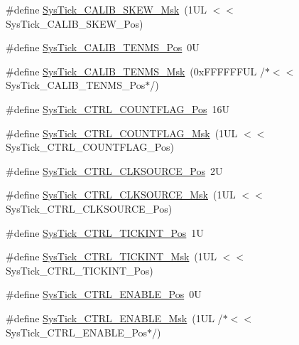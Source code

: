 \begin{DoxyCompactItemize}
\item 
\#define \hyperlink{group___c_m_s_i_s___sys_tick_ga8a6a85a87334776f33d77fd147587431}{Sys\-Tick\-\_\-\-C\-A\-L\-I\-B\-\_\-\-S\-K\-E\-W\-\_\-\-Msk}~(1\-U\-L $<$$<$ Sys\-Tick\-\_\-\-C\-A\-L\-I\-B\-\_\-\-S\-K\-E\-W\-\_\-\-Pos)
\item 
\#define \hyperlink{group___c_m_s_i_s___sys_tick_gacae558f6e75a0bed5d826f606d8e695e}{Sys\-Tick\-\_\-\-C\-A\-L\-I\-B\-\_\-\-T\-E\-N\-M\-S\-\_\-\-Pos}~0\-U
\item 
\#define \hyperlink{group___c_m_s_i_s___sys_tick_gaf1e68865c5aece2ad58971225bd3e95e}{Sys\-Tick\-\_\-\-C\-A\-L\-I\-B\-\_\-\-T\-E\-N\-M\-S\-\_\-\-Msk}~(0x\-F\-F\-F\-F\-F\-F\-U\-L /$\ast$$<$$<$ Sys\-Tick\-\_\-\-C\-A\-L\-I\-B\-\_\-\-T\-E\-N\-M\-S\-\_\-\-Pos$\ast$/)
\item 
\#define \hyperlink{group___c_m_s_i_s___sys_tick_gadbb65d4a815759649db41df216ed4d60}{Sys\-Tick\-\_\-\-C\-T\-R\-L\-\_\-\-C\-O\-U\-N\-T\-F\-L\-A\-G\-\_\-\-Pos}~16\-U
\item 
\#define \hyperlink{group___c_m_s_i_s___sys_tick_ga1bf3033ecccf200f59baefe15dbb367c}{Sys\-Tick\-\_\-\-C\-T\-R\-L\-\_\-\-C\-O\-U\-N\-T\-F\-L\-A\-G\-\_\-\-Msk}~(1\-U\-L $<$$<$ Sys\-Tick\-\_\-\-C\-T\-R\-L\-\_\-\-C\-O\-U\-N\-T\-F\-L\-A\-G\-\_\-\-Pos)
\item 
\#define \hyperlink{group___c_m_s_i_s___sys_tick_ga24fbc69a5f0b78d67fda2300257baff1}{Sys\-Tick\-\_\-\-C\-T\-R\-L\-\_\-\-C\-L\-K\-S\-O\-U\-R\-C\-E\-\_\-\-Pos}~2\-U
\item 
\#define \hyperlink{group___c_m_s_i_s___sys_tick_gaa41d06039797423a46596bd313d57373}{Sys\-Tick\-\_\-\-C\-T\-R\-L\-\_\-\-C\-L\-K\-S\-O\-U\-R\-C\-E\-\_\-\-Msk}~(1\-U\-L $<$$<$ Sys\-Tick\-\_\-\-C\-T\-R\-L\-\_\-\-C\-L\-K\-S\-O\-U\-R\-C\-E\-\_\-\-Pos)
\item 
\#define \hyperlink{group___c_m_s_i_s___sys_tick_ga88f45bbb89ce8df3cd2b2613c7b48214}{Sys\-Tick\-\_\-\-C\-T\-R\-L\-\_\-\-T\-I\-C\-K\-I\-N\-T\-\_\-\-Pos}~1\-U
\item 
\#define \hyperlink{group___c_m_s_i_s___sys_tick_ga95bb984266ca764024836a870238a027}{Sys\-Tick\-\_\-\-C\-T\-R\-L\-\_\-\-T\-I\-C\-K\-I\-N\-T\-\_\-\-Msk}~(1\-U\-L $<$$<$ Sys\-Tick\-\_\-\-C\-T\-R\-L\-\_\-\-T\-I\-C\-K\-I\-N\-T\-\_\-\-Pos)
\item 
\#define \hyperlink{group___c_m_s_i_s___sys_tick_ga0b48cc1e36d92a92e4bf632890314810}{Sys\-Tick\-\_\-\-C\-T\-R\-L\-\_\-\-E\-N\-A\-B\-L\-E\-\_\-\-Pos}~0\-U
\item 
\#define \hyperlink{group___c_m_s_i_s___sys_tick_ga16c9fee0ed0235524bdeb38af328fd1f}{Sys\-Tick\-\_\-\-C\-T\-R\-L\-\_\-\-E\-N\-A\-B\-L\-E\-\_\-\-Msk}~(1\-U\-L /$\ast$$<$$<$ Sys\-Tick\-\_\-\-C\-T\-R\-L\-\_\-\-E\-N\-A\-B\-L\-E\-\_\-\-Pos$\ast$/)

\end{DoxyCompactItemize}
